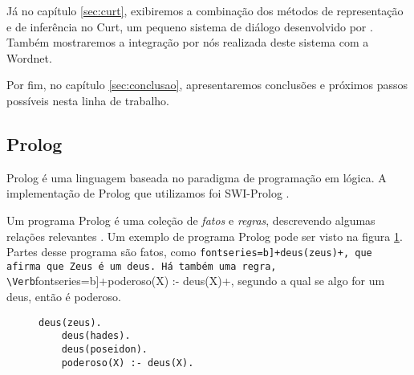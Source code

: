 
Já no capítulo \ref{sec:curt}, exibiremos a combinação dos métodos de representação e de inferência no Curt, um pequeno sistema de diálogo desenvolvido por \citet{BlackburnBos:2005}. Também mostraremos a integração por nós realizada deste sistema com a Wordnet.

Por fim, no capítulo \ref{sec:conclusao}, apresentaremos conclusões e próximos passos possíveis nesta linha de trabalho.

\subsection{Prolog}
\FloatBarrier
	Prolog é uma linguagem baseada no paradigma de programação em lógica. A implementação de Prolog que utilizamos foi SWI-Prolog \citep{prolog-swi}.
	
	Um programa Prolog é uma coleção de \textit{fatos} e \textit{regras}, descrevendo algumas relações relevantes \cite[p.~7]{prolog-learnnow}. Um exemplo de programa Prolog pode ser visto na figura \ref{fig:prolog-programa}. Partes desse programa são fatos, como \Verb[fontseries=b]+deus(zeus)+, que afirma que Zeus é um deus. Há também uma regra,  \Verb[fontseries=b]+poderoso(X) :- deus(X)+, segundo a qual se algo for um deus, então é poderoso.
	
	\begin{figure}
	\begin{Verbatim}[fontseries=b,gobble=1]
	deus(zeus). 
	deus(hades).
	deus(poseidon).
	poderoso(X) :- deus(X).
	\end{Verbatim}
	\caption{}
	\label{fig:prolog-programa}
	\end{figure}
	
